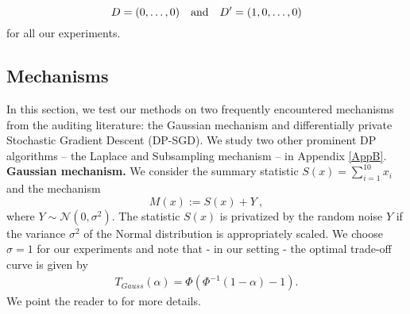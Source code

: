 \begin{equation}\label{eq_databases}
    D=(0,\hdots, 0)\quad \textnormal{and} \quad D'=(1,0,\hdots, 0)
\end{equation}
for all our experiments.

\subsection{Mechanisms}\label{sec:algorithms}
In this section, we test our methods on two frequently encountered mechanisms from the auditing literature: the Gaussian mechanism and differentially private Stochastic Gradient Descent (DP-SGD). We study two other prominent DP algorithms -- the Laplace and Subsampling mechanism -- in Appendix \ref{AppB}. \\

\noindent \textbf{Gaussian mechanism.}
We consider the summary statistic $S(x)= \sum_{i=1}^{10} x_i$ and the mechanism
\begin{equation*}
    M(x):= S(x)+Y~,
\end{equation*}
where $Y\sim \mathcal N (0, \sigma^2)$. The statistic $S(x)$ is privatized by the random noise $Y$ if the variance $\sigma^2$ of the Normal distribution is appropriately scaled. We choose $\sigma = 1$ for our experiments and note that - in our setting - the optimal trade-off curve is given by 
\begin{align*}
     T_{Gauss}(\alpha)= \Phi(\Phi^{-1}(1-\alpha)- 1).
\end{align*}
We point the reader to \cite{Dong2022} for more details. \\








